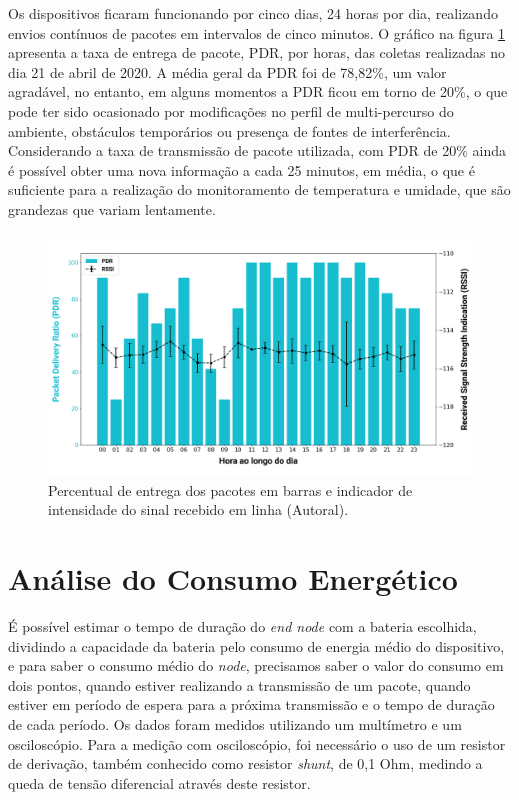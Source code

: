 Os dispositivos ficaram funcionando por cinco dias, 24 horas por dia, realizando envios contínuos de pacotes em intervalos de cinco minutos. O gráfico na figura \ref{fig:21-04-2020-pdr-rssi} apresenta a taxa de entrega de pacote, PDR, por horas, das coletas realizadas no dia 21 de abril de 2020. A média geral da PDR foi de 78,82\%, um valor agradável, no entanto, em alguns momentos a PDR ficou em torno de 20\%, o que pode ter sido ocasionado por modificações no perfil de multi-percurso do ambiente, obstáculos temporários ou presença de fontes de interferência. Considerando a taxa de transmissão de pacote utilizada, com PDR de 20\% ainda é possível obter uma nova informação a cada 25 minutos, em média, o que é suficiente para a realização do monitoramento de temperatura e umidade, que são grandezas que variam lentamente.

\begin{figure}[H]
  \centering
  \includegraphics[width=.80\textwidth]{assets/21-04-2020-pdr-rssi.png} 
  \caption{Percentual de entrega dos pacotes em barras e indicador de intensidade do sinal recebido em linha (Autoral).}
  \label{fig:21-04-2020-pdr-rssi} 
\end{figure}

\section{Análise do Consumo Energético}
\label{result:consumo}
É possível estimar o tempo de duração do \textit{end node} com a bateria escolhida, dividindo a capacidade da bateria pelo consumo de energia médio do dispositivo, e para saber o consumo médio do \textit{node}, precisamos saber o valor do consumo em dois pontos, quando estiver realizando a transmissão de um pacote,  quando estiver em período de espera para a próxima transmissão e o tempo de duração de cada período. Os dados foram medidos utilizando um multímetro e um osciloscópio. Para a medição com osciloscópio, foi necessário o uso de um resistor de derivação, também conhecido como resistor \textit{shunt}, de 0,1 Ohm, medindo a queda de tensão diferencial através deste resistor.

